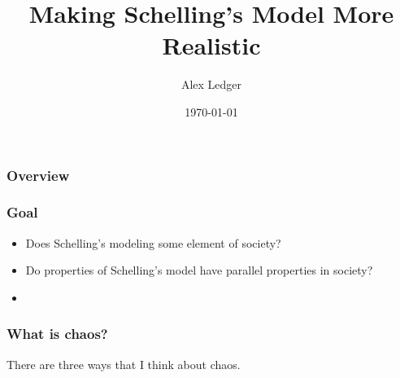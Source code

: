 \documentclass[11pt, handout]{beamer}
\title[Short title]{Making Schelling's Model More Realistic} %
\author{Alex Ledger} %
\institute[Reed College] %
{
Reed College \\ %
\medskip
\textit{aledger@reed.edu}%
}
\date{\today} %
\begin{document}
\begin{frame}
\titlepage 
\end{frame}

\begin{frame}
\frametitle{Overview} 
\end{frame}

\begin{frame}
    \frametitle{Goal}
    \begin{itemize}
        \item Does Schelling's modeling some element of society?
        \item Do properties of Schelling's model have parallel properties in society?
        \item 
    \end{itemize}
\end{frame}

\begin{frame}
    \frametitle{What is chaos?}
    There are three ways that I think about chaos.
\end{frame}
\end{document}

